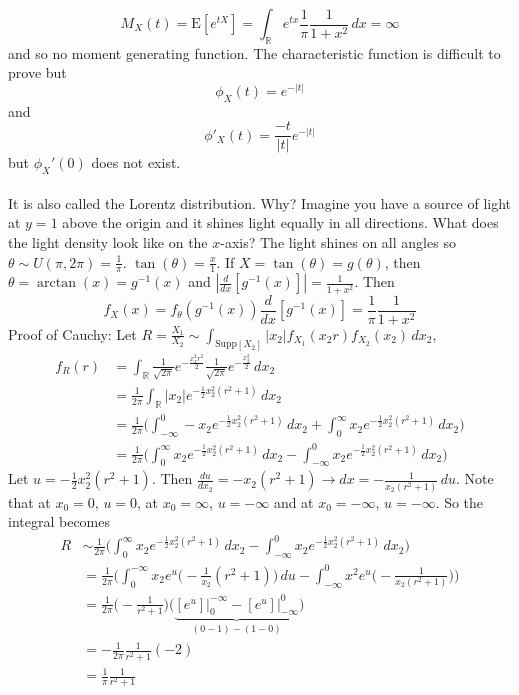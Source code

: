 \documentclass[12pt]{article}
\newcommand{\supp}[1]{\text{Supp}[ #1 ]}
\newcommand{\expected}[1]{\mathrm{E}[#1]}
\begin{document}
$$M_X(t) = \expected{e^{tX}} = \int_{\mathbb{R}} e^{tx} \frac{1}{\pi} \frac{1}{1 + x^2} \, dx = \infty $$ and so no moment generating function. The characteristic function is difficult to prove but $$\phi_X(t) = e^{-|t|}$$ and $$\phi'_X(t) = \frac{-t}{|t|} e^{-|t|} $$ but $\phi_X'(0)$ does not exist. \\~\\
It is also called the Lorentz distribution. Why? Imagine you have a source of light at $y = 1$ above the origin and it shines light equally in all directions. What does the light density look like on the $x$-axis? The light shines on all angles so $\theta \sim U(\pi, 2\pi) = \frac{1}{\pi}$. $\tan(\theta) = \frac{x}{1}$. If $X = \tan(\theta) = g(\theta)$, then $\theta = \arctan(x) = g^{-1}(x)$ and $|\frac{d}{dx} [g^{-1}(x)]| = \frac{1}{1+x^2}$. Then $$f_X(x) = f_{\theta}(g^{-1}(x))\frac{d}{dx}[g^{-1}(x)] = \frac{1}{\pi}\frac{1}{1+x^2} $$ 
Proof of Cauchy: Let $R = \frac{X_1}{X_2} \sim \int_{\supp{X_2}} |x_2|f_{X_1}(x_2r)f_{X_2}(x_2) \, dx_2$, $$ \begin{aligned} f_R(r) &= \int_{\mathbb{R}} \frac{1}{\sqrt{2\pi}} e^{-\frac{x^2_xr^2}{2}} \frac{1}{\sqrt{2\pi}} e^{-\frac{x_2^2}{2}} \,dx_2 \\ &= \frac{1}{2\pi} \int_{\mathbb{R}} |x_2| e^{-\frac{1}{2}x_2^2(r^2 + 1)} \, dx_2 \\ &= \frac{1}{2\pi} \Bigg( \int_{-\infty}^0 -x_2 e^{-\frac{1}{2}x_2^2(r^2 + 1)} \, dx_2 + \int_0^\infty x_2e^{-\frac{1}{2}x_2^2(r^2 + 1)} \, dx_2 \Bigg) \\ &= \frac{1}{2\pi} \Bigg( \int_0^\infty x_2 e^{-\frac{1}{2}x_2^2(r^2 + 1)} \, dx_2 - \int_{-\infty}^0  x_2e^{-\frac{1}{2}x_2^2(r^2 + 1)} \, dx_2 \Bigg) \end{aligned} $$ 
Let $u = -\frac{1}{2}x_2^2(r^2 + 1)$. Then $ \frac{du}{dx_2} = -x_2(r^2 + 1) \to dx = - \frac{1}{x_2(r^2 + 1)} \, du$. Note that at $x_0 = 0$, $u = 0$, at $x_0 = \infty$, $u = -\infty$ and at $x_0 = -\infty$, $u = -\infty$. So the integral becomes $$\begin{aligned} R &\sim \frac{1}{2\pi} \Bigg( \int_0^\infty x_2 e^{-\frac{1}{2}x_2^2(r^2 + 1)} \, dx_2 - \int_{-\infty}^0  x_2e^{-\frac{1}{2}x_2^2(r^2 + 1)} \, dx_2 \Bigg) \\ &= \frac{1}{2\pi} \Bigg( \int_0^{-\infty} x_2 e^u  \Big( - \frac{1}{x_2}(r^2 + 1) \Big) \, du - \int_{-\infty}^0 x^2 e^u \Big( -\frac{1}{x_2(r^2 + 1)} \Big) \Bigg) \\ &= \frac{1}{2\pi} \Big(- \frac{1}{r^2 + 1} \Big) \Bigg( \underbrace{[e^u]\Big|_0^{-\infty} - [e^u]\Big|_{-\infty}^0}_{(0 - 1) - (1 - 0)}\Bigg) \\ &= -\frac{1}{2\pi} \frac{1}{r^2 + 1} (-2) \\ &= \frac{1}{\pi}\frac{1}{r^2 + 1} \end{aligned} $$ 
\end{document}
